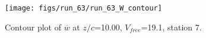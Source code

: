 \begin{figure}[H]
\centering
\texttt{[image: figs/run\_63/run\_63\_W\_contour]}
\caption{Contour plot of $\overline{w}$ at $z/c$=10.00, $V_{free}$=19.1, station 7.}
\label{fig:run_63_W_contour}
\end{figure}


